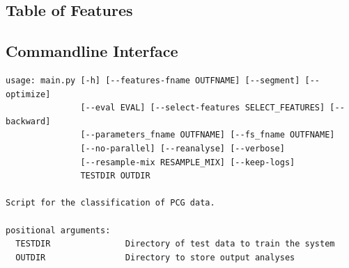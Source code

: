 \documentclass[titlepage, 12pt]{scrartcl} \usepackage{enumitem}
\begin{document}
\subsection{Table of Features}\label{appendixA}
\subsection{Commandline Interface}\label{appendixB}
\singlespacing
\lstset{basicstyle=\scriptsize, style=mystyle}
\begin{lstlisting}[numbers=none]
usage: main.py [-h] [--features-fname OUTFNAME] [--segment] [--optimize]
               [--eval EVAL] [--select-features SELECT_FEATURES] [--backward]
               [--parameters_fname OUTFNAME] [--fs_fname OUTFNAME]
               [--no-parallel] [--reanalyse] [--verbose]
               [--resample-mix RESAMPLE_MIX] [--keep-logs]
               TESTDIR OUTDIR

Script for the classification of PCG data.

positional arguments:
  TESTDIR               Directory of test data to train the system
  OUTDIR                Directory to store output analyses


\end{lstlisting}
\end{document}
